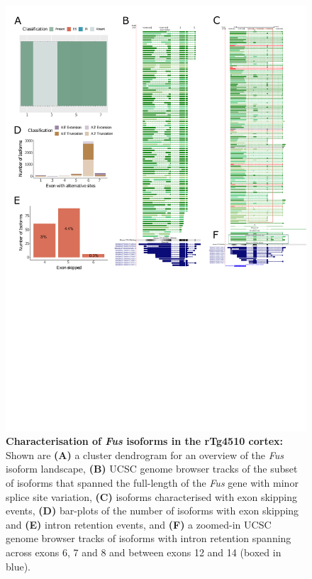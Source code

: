 \begin{figure}[htp]
	\centering
	\includegraphics[page=4,trim={0 4cm 0 0},scale = 0.85]{Figures/TargetGenes_Annotation_Portrait.pdf}
	\captionsetup{width=0.95\textwidth}
	\caption[Characterisation of \textit{Fus} isoforms in the rTg4510 cortex]%
	{\textbf{Characterisation of \textit{Fus} isoforms in the rTg4510 cortex:} Shown are \textbf{(A)} a cluster dendrogram for an overview of the \textit{Fus} isoform landscape, \textbf{(B)} UCSC genome browser tracks of the subset of isoforms that spanned the full-length of the \textit{Fus} gene with minor splice site variation, \textbf{(C)} isoforms characterised with exon skipping events, \textbf{(D)} bar-plots of the number of isoforms with exon skipping and \textbf{(E)} intron retention events, and \textbf{(F)} a zoomed-in UCSC genome browser tracks of isoforms with intron retention spanning across exons 6, 7 and 8 and between exons 12 and 14 (boxed in blue).}    
	\label{fig:fus}
\end{figure}
\restoregeometry

